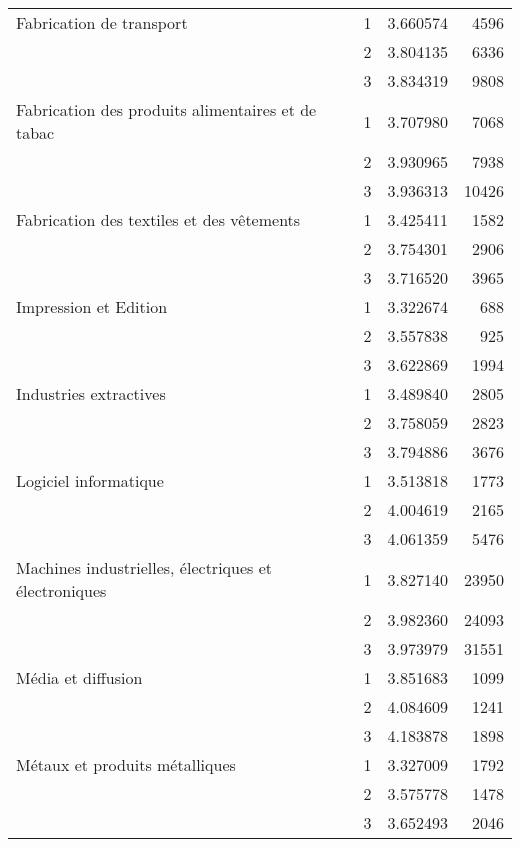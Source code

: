 \begin{tabular}{llrr}
Fabrication de transport & 1 &  3.660574 &   4596 \\
                             & 2 &  3.804135 &   6336 \\
                             & 3 &  3.834319 &   9808 \\
Fabrication des produits alimentaires et de tabac & 1 &  3.707980 &   7068 \\
                             & 2 &  3.930965 &   7938 \\
                             & 3 &  3.936313 &  10426 \\
Fabrication des textiles et des vêtements & 1 &  3.425411 &   1582 \\
                             & 2 &  3.754301 &   2906 \\
                             & 3 &  3.716520 &   3965 \\
Impression et Edition & 1 &  3.322674 &    688 \\
                             & 2 &  3.557838 &    925 \\
                             & 3 &  3.622869 &   1994 \\
Industries extractives & 1 &  3.489840 &   2805 \\
                             & 2 &  3.758059 &   2823 \\
                             & 3 &  3.794886 &   3676 \\
Logiciel informatique & 1 &  3.513818 &   1773 \\
                             & 2 &  4.004619 &   2165 \\
                             & 3 &  4.061359 &   5476 \\
Machines industrielles, électriques et électroniques & 1 &  3.827140 &  23950 \\
                             & 2 &  3.982360 &  24093 \\
                             & 3 &  3.973979 &  31551 \\
Média et diffusion & 1 &  3.851683 &   1099 \\
                             & 2 &  4.084609 &   1241 \\
                             & 3 &  4.183878 &   1898 \\
Métaux et produits métalliques & 1 &  3.327009 &   1792 \\
                             & 2 &  3.575778 &   1478 \\
                             & 3 &  3.652493 &   2046 \\

\end{tabular}
